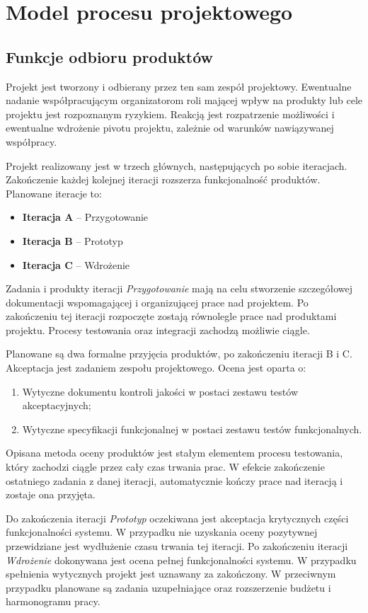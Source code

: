 \newpage
\section{Model procesu projektowego}

\subsection{Funkcje odbioru produktów}
Projekt jest tworzony i odbierany przez ten sam zespół projektowy. Ewentualne
nadanie współpracującym organizatorom roli mającej wpływ na produkty lub cele
projektu jest rozpoznanym ryzykiem. Reakcją jest rozpatrzenie możliwości
i ewentualne wdrożenie pivotu projektu, zależnie od warunków nawiązywanej
współpracy.

Projekt realizowany jest w trzech głównych, następujących po sobie iteracjach.
Zakończenie każdej kolejnej iteracji rozszerza funkcjonalność produktów.
Planowane iteracje to:
\begin{itemize}[noitemsep]
    \item \textbf{Iteracja A} -- Przygotowanie
    \item \textbf{Iteracja B} -- Prototyp
    \item \textbf{Iteracja C} -- Wdrożenie
\end{itemize}

Zadania i produkty iteracji \emph{Przygotowanie} mają na celu stworzenie
szczegółowej dokumentacji wspomagającej i organizującej prace nad projektem. Po
zakończeniu tej iteracji rozpoczęte zostają równolegle prace nad produktami
projektu. Procesy testowania oraz integracji zachodzą możliwie ciągle.

Planowane są dwa formalne przyjęcia produktów, po zakończeniu iteracji B i C.
Akceptacja jest zadaniem zespołu projektowego. Ocena jest oparta o:
\begin{enumerate}
    \item Wytyczne dokumentu kontroli jakości w postaci zestawu testów
        akceptacyjnych;
    \item Wytyczne specyfikacji funkcjonalnej w postaci zestawu testów
        funkcjonalnych.
\end{enumerate}
Opisana metoda oceny produktów jest stałym elementem procesu testowania, który
zachodzi ciągle przez cały czas trwania prac. W efekcie zakończenie ostatniego
zadania z danej iteracji, automatycznie kończy prace nad iteracją i zostaje ona
przyjęta.

Do zakończenia iteracji \emph{Prototyp} oczekiwana jest akceptacja krytycznych
części funkcjonalności systemu. W przypadku nie uzyskania oceny pozytywnej
przewidziane jest wydłużenie czasu trwania tej iteracji. Po zakończeniu iteracji
\emph{Wdrożenie} dokonywana jest ocena pełnej funkcjonalności systemu. W
przypadku spełnienia wytycznych projekt jest uznawany za zakończony. W
przeciwnym przypadku planowane są zadania uzupełniające oraz rozszerzenie
budżetu i harmonogramu pracy.

